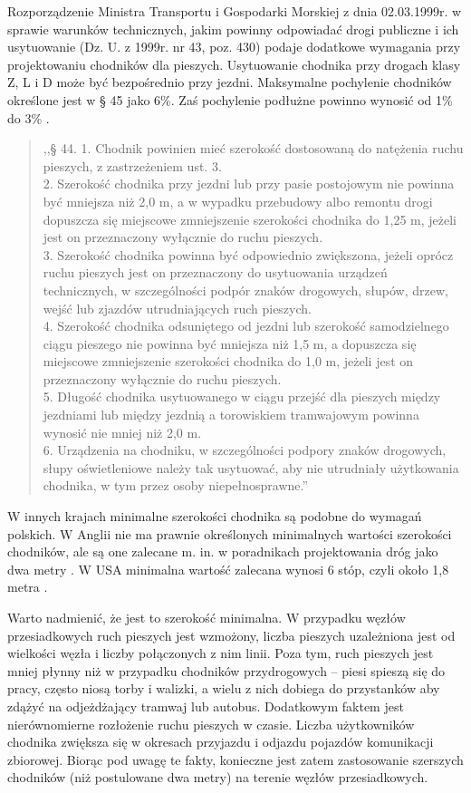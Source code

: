 \documentclass[twoside,12pt]{article}
\begin{document}
	Rozporządzenie Ministra Transportu i Gospodarki Morskiej z dnia 02.03.1999r. w sprawie warunków technicznych, jakim powinny odpowiadać drogi publiczne i ich usytuowanie (Dz. U. z 1999r. nr 43, poz. 430)  podaje dodatkowe wymagania przy projektowaniu chodników dla pieszych. Usytuowanie chodnika przy drogach klasy Z, L i D może być bezpośrednio przy jezdni. Maksymalne pochylenie chodników określone jest w § 45 jako 6\%. Zaś pochylenie podłużne powinno wynosić od 1\% do 3\% \cite{rozporzadzenie_drogi}.
	\begin{quote}
	,,§ 44. 1. Chodnik powinien mieć szerokość dostosowaną do natężenia ruchu pieszych, z zastrzeżeniem ust. 3.\\
2. Szerokość chodnika przy jezdni lub przy pasie postojowym nie powinna być mniejsza niż 2,0 m, a w wypadku przebudowy
albo remontu drogi dopuszcza się miejscowe zmniejszenie szerokości chodnika do 1,25 m, jeżeli jest on przeznaczony
wyłącznie do ruchu pieszych.\\
3. Szerokość chodnika powinna być odpowiednio zwiększona, jeżeli oprócz ruchu pieszych jest on przeznaczony do
usytuowania urządzeń technicznych, w szczególności podpór znaków drogowych, słupów, drzew, wejść lub zjazdów utrudniających
ruch pieszych.\\
4. Szerokość chodnika odsuniętego od jezdni lub szerokość samodzielnego ciągu pieszego nie powinna być mniejsza
niż 1,5 m, a dopuszcza się miejscowe zmniejszenie szerokości chodnika do 1,0 m, jeżeli jest on przeznaczony wyłącznie do
ruchu pieszych.\\
5. Długość chodnika usytuowanego w ciągu przejść dla pieszych między jezdniami lub między jezdnią a torowiskiem
tramwajowym powinna wynosić nie mniej niż 2,0 m.\\
6. Urządzenia na chodniku, w szczególności podpory znaków drogowych, słupy oświetleniowe należy tak usytuować,
aby nie utrudniały użytkowania chodnika, w tym przez osoby niepełnosprawne.'' \cite{rozporzadzenie_drogi}
	 \end{quote}
	 
	 W innych krajach minimalne szerokości chodnika są podobne do wymagań polskich. W Anglii nie ma prawnie określonych minimalnych wartości szerokości chodników, ale są one zalecane m. in. w poradnikach projektowania dróg jako dwa metry \cite{young}. W USA minimalna wartość zalecana wynosi 6 stóp, czyli około 1,8 metra \cite{guidelines_washington}. 
	 
	 Warto nadmienić, że jest to szerokość minimalna. W przypadku węzłów przesiadkowych ruch pieszych jest wzmożony, liczba pieszych uzależniona jest od wielkości węzła i liczby połączonych z nim linii. Poza tym, ruch pieszych jest mniej płynny niż w przypadku chodników przydrogowych -- piesi spieszą się do pracy, często niosą torby i walizki, a wielu z nich dobiega do przystanków aby zdążyć na odjeżdżający tramwaj lub autobus. Dodatkowym faktem jest nierównomierne rozłożenie ruchu pieszych w czasie. Liczba użytkowników chodnika zwiększa się w okresach przyjazdu i odjazdu pojazdów komunikacji zbiorowej. Biorąc pod uwagę te fakty, konieczne jest zatem zastosowanie szerszych chodników (niż postulowane dwa metry) na terenie węzłów przesiadkowych. 
	 
\end{document}
